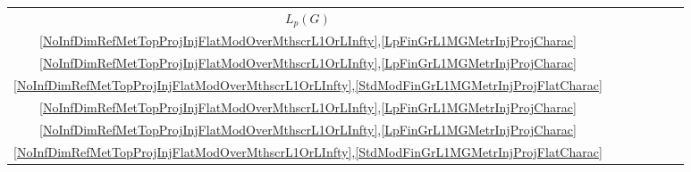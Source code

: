 \begin{scriptsize}
\begin{longtable}{|c|c|c|c|c|c|c|}
 $L_p(G)$           & \begin{tabular}{@{}c@{}}$G=\{e_G\}$ \\ \ref{NoInfDimRefMetTopProjInjFlatModOverMthscrL1OrLInfty},\ref{LpFinGrL1MGMetrInjProjCharac}\end{tabular}                  & \begin{tabular}{@{}c@{}}$G=\{e_G\}$ \\ \ref{NoInfDimRefMetTopProjInjFlatModOverMthscrL1OrLInfty},\ref{LpFinGrL1MGMetrInjProjCharac}\end{tabular}                  & \begin{tabular}{@{}c@{}}$G=\{e_G\}$ \\ \ref{NoInfDimRefMetTopProjInjFlatModOverMthscrL1OrLInfty},\ref{StdModFinGrL1MGMetrInjProjFlatCharac}\end{tabular}           & \begin{tabular}{@{}c@{}}$G=\{e_G\}$ \\ \ref{NoInfDimRefMetTopProjInjFlatModOverMthscrL1OrLInfty},\ref{LpFinGrL1MGMetrInjProjCharac}\end{tabular}                 & \begin{tabular}{@{}c@{}}$G=\{e_G\}$ \\ \ref{NoInfDimRefMetTopProjInjFlatModOverMthscrL1OrLInfty},\ref{LpFinGrL1MGMetrInjProjCharac}\end{tabular}                   & \begin{tabular}{@{}c@{}}$G=\{e_G\}$ \\ \ref{NoInfDimRefMetTopProjInjFlatModOverMthscrL1OrLInfty},\ref{StdModFinGrL1MGMetrInjProjFlatCharac}\end{tabular}          \\
\hline

\end{longtable}
\end{scriptsize}
